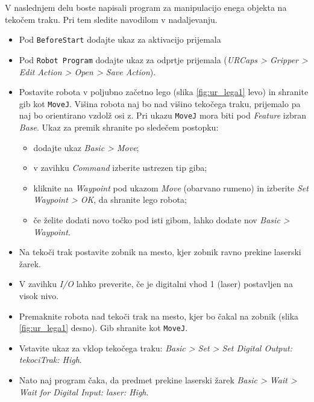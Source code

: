 V naslednjem delu boste napisali program za manipulacijo enega objekta na tekočem traku. Pri tem sledite navodilom v nadaljevanju.

\begin{mdframed}[backgroundcolor=yellow!20, shadow=true,roundcorner=8pt]
\begin{itemize}
  \item Pod \verb"BeforeStart" dodajte ukaz za aktivacijo prijemala
  \item Pod \verb"Robot Program" dodajte ukaz za odprtje prijemala (\emph{URCaps > Gripper > Edit Action > Open > Save Action}).
  \item Postavite robota v poljubno začetno lego (slika \ref{fig:ur_lega1} levo) in shranite gib kot \verb"MoveJ". Višina robota naj bo nad višino tekočega traku, prijemalo pa naj bo orientirano vzdolž osi z. Pri ukazu \verb"MoveJ" mora biti pod \emph{Feature} izbran \emph{Base}. Ukaz za premik shranite po sledečem postopku:
      \begin{itemize}
        \item dodajte ukaz \emph{Basic > Move};
        \item v zavihku \emph{Command} izberite ustrezen tip giba;
        \item kliknite na \emph{Waypoint} pod ukazom \emph{Move} (obarvano rumeno) in izberite \emph{Set Waypoint > OK}, da shranite lego robota;
        \item če želite dodati novo točko pod isti gibom, lahko dodate nov \emph{Basic > Waypoint}.
      \end{itemize}
  \item Na tekoči trak postavite zobnik na mesto, kjer zobnik ravno prekine laserski žarek.
    \item  V zavihku \emph{I/O} lahko preverite, če je digitalni vhod 1 (laser) postavljen na visok nivo.
  \item Premaknite robota nad tekoči trak na mesto, kjer bo čakal na zobnik (slika \ref{fig:ur_lega1} desno). Gib shranite kot \verb"MoveJ".
%
%
%
  \item Vstavite ukaz za vklop tekočega traku: \emph{Basic > Set > Set Digital Output: tekociTrak: High}.
  \item Nato naj program čaka, da predmet prekine laserski žarek \emph{Basic > Wait > Wait for Digital Input: laser: High}.

\end{itemize}
\end{mdframed}
